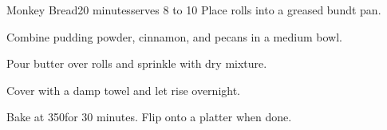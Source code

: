 \begin{recipe}{Monkey Bread}{20 minutes}{serves 8 to 10}
Place rolls into a greased bundt pan.

Combine pudding powder, cinnamon, and pecans in a medium bowl. 

Pour butter over rolls and sprinkle with dry mixture.\newstep

Cover with a damp towel and let rise overnight.\newstep

Bake at 350\degrees for 30 minutes. Flip onto a platter when done.

\end{recipe}
